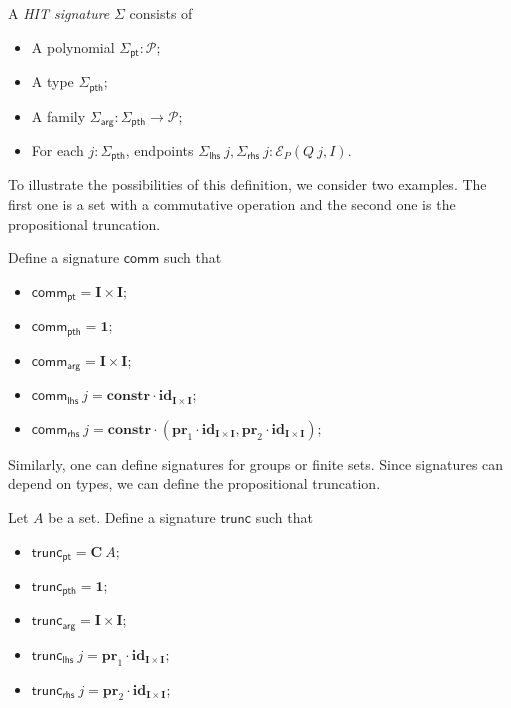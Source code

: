 \documentclass[9pt]{entcs}
\newcommand{\constructor}[1]{\mathbf{#1}}
\newcommand{\function}[1]{\mathsf{#1}}
\newcommand{\0}{\textbf{0}} %
\newcommand{\1}{\textbf{1}} %
\newcommand{\poly}{\mathcal{P}} %
\newcommand{\C}{\constructor{C}} %
\newcommand{\I}{\constructor{I}} %
\newcommand{\prodP}[2]{#1 \times #2} %
\newcommand{\ep}[3]{\mathcal{E}_{#1}(#2,#3)} %
\newcommand{\id}[1]{\constructor{id}_{#1}} %
\newcommand{\comp}[2]{#1 \cdot #2} %
\newcommand{\prle}{\constructor{pr}_1} %
\newcommand{\prre}{\constructor{pr}_2} %
\newcommand{\pair}[2]{(#1 , #2)} %
\newcommand{\constr}{\constructor{constr}} %
\newcommand{\pt}[0]{\textsf{pt}}
\newcommand{\pthI}[0]{\textsf{pth}}
\newcommand{\pthA}[0]{\textsf{arg}}
\newcommand{\pthlh}[0]{\textsf{lhs}}
\newcommand{\pthrh}[0]{\textsf{rhs}}
\newcommand{\pointc}[1]{#1_{\pt}} %
\newcommand{\pathI}[1]{#1_{\pthI}} %
\newcommand{\pathA}[1]{#1_{\pthA}} %
\newcommand{\pathlh}[1]{#1_{\pthlh}} %
\newcommand{\pathrh}[1]{#1_{\pthrh}} %
\newcommand{\comm}{\function{comm}}
\newcommand{\trunc}{\function{trunc}}
\begin{document}
\begin{definition}
\label{def:signature}
A \emph{HIT signature} $\Sigma$ consists of
\begin{itemize}
	\item A polynomial $\pointc{\Sigma} : \poly$;
	\item A type $\pathI{\Sigma}$;
	\item A family $\pathA{\Sigma} : \pathI{\Sigma} \rightarrow \poly$;
	\item For each $j : \pathI{\Sigma}$, endpoints $\pathlh{\Sigma} \> j, \pathrh{\Sigma} \> j : \ep{P}{Q \> j}{I}$.
\end{itemize}
\end{definition}

To illustrate the possibilities of this definition, we consider two examples.
The first one is a set with a commutative operation and the second one is the propositional truncation.

\begin{example}
\label{ex:commsig}
Define a signature $\comm$ such that
\begin{itemize}
	\item $\pointc{\comm} = \prodP{\I}{\I}$;
	\item $\pathI{\comm} = \1$;
	\item $\pathA{\comm} = \prodP{\I}{\I}$;
	\item $\pathlh{\comm} \> j = \comp{\constr}{\id{\prodP{\I}{\I}}}$;
	\item $\pathrh{\comm} \> j = \comp{\constr}{\pair{\comp{\prle}{\id{\prodP{\I}{\I}}}}{\comp{\prre}{\id{\prodP{\I}{\I}}}}}$;
\end{itemize}
\end{example}

Similarly, one can define signatures for groups or finite sets.
Since signatures can depend on types, we can define the propositional truncation.

\begin{example}
\label{ex:truncsig}
Let $A$ be a set.
Define a signature $\trunc$ such that
\begin{itemize}
	\item $\pointc{\trunc} = \C \> A$;
	\item $\pathI{\trunc} = \1$;
	\item $\pathA{\trunc} = \prodP{\I}{\I}$;
	\item $\pathlh{\trunc} \> j = \comp{\prle}{\id{\prodP{\I}{\I}}}$;
	\item $\pathrh{\trunc} \> j = \comp{\prre}{\id{\prodP{\I}{\I}}}$;
\end{itemize}
\end{example}
\end{document}
